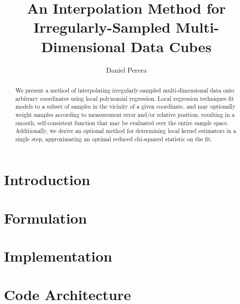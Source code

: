 \documentclass[preprint]{aastex63}
\begin{document}
\title{An Interpolation Method for Irregularly-Sampled Multi-Dimensional Data
       Cubes}


\author{Daniel Perera}


\begin{abstract}

We present a method of interpolating irregularly-sampled multi-dimensional data
onto arbitrary coordinates using local polynomial regression.
Local regression techniques fit models to a subset of samples in the vicinity
of a given coordinate, and may optionally weight samples according to
measurement error and/or relative position, resulting in a smooth,
self-consistent function that may be evaluated over the entire sample space.
Additionally, we derive an optional method for determining local kernel
estimators in a single step, approximating an optimal reduced chi-squared
statistic on the fit.

\end{abstract}




\section{Introduction}\label{sec:introduction}


\section{Formulation}\label{sec:formulation}


\section{Implementation}\label{sec:implementation}


\section{Code Architecture}\label{sec:code-architecture}

\end{document}

